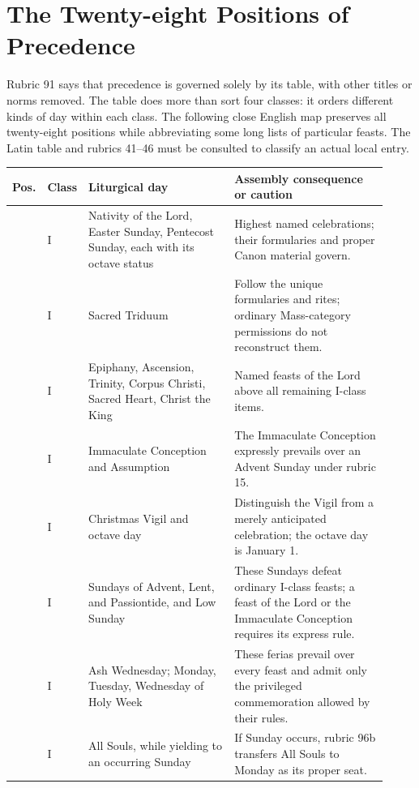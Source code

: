 \section{The Twenty-eight Positions of Precedence}

Rubric 91 says that precedence is governed solely by its table, with other titles or norms removed. The table does more than sort four classes: it orders different kinds of day within each class. The following close English map preserves all twenty-eight positions while abbreviating some long lists of particular feasts. The Latin table and rubrics 41--46 must be consulted to classify an actual local entry.

\begingroup
\footnotesize
\begin{longtable}{>{\centering\arraybackslash}p{0.045\linewidth}>{\centering\arraybackslash}p{0.07\linewidth}>{\raggedright\arraybackslash}p{0.39\linewidth}>{\raggedright\arraybackslash}p{0.41\linewidth}}
\toprule
Pos. & Class & Liturgical day & Assembly consequence or caution\\
\midrule
\endhead
1 & I & Nativity of the Lord, Easter Sunday, Pentecost Sunday, each with its octave status & Highest named celebrations; their formularies and proper Canon material govern.\\
2 & I & Sacred Triduum & Follow the unique formularies and rites; ordinary Mass-category permissions do not reconstruct them.\\
3 & I & Epiphany, Ascension, Trinity, Corpus Christi, Sacred Heart, Christ the King & Named feasts of the Lord above all remaining I-class items.\\
4 & I & Immaculate Conception and Assumption & The Immaculate Conception expressly prevails over an Advent Sunday under rubric 15.\\
5 & I & Christmas Vigil and octave day & Distinguish the Vigil from a merely anticipated celebration; the octave day is January 1.\\
6 & I & Sundays of Advent, Lent, and Passiontide, and Low Sunday & These Sundays defeat ordinary I-class feasts; a feast of the Lord or the Immaculate Conception requires its express rule.\\
7 & I & Ash Wednesday; Monday, Tuesday, Wednesday of Holy Week & These ferias prevail over every feast and admit only the privileged commemoration allowed by their rules.\\
8 & I & All Souls, while yielding to an occurring Sunday & If Sunday occurs, rubric 96b transfers All Souls to Monday as its proper seat.\\

\end{longtable}
